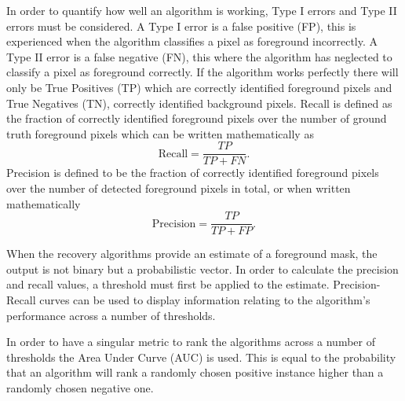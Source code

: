\documentclass[conference]{IEEEtran}
\begin{document}
In order to quantify how well an algorithm is working, Type I errors and Type II errors must be considered. A Type I error is a false positive (FP), this is experienced when the algorithm classifies a pixel as foreground incorrectly. A Type II error is a false negative (FN), this where the algorithm has neglected to classify a pixel as foreground correctly. If the algorithm works perfectly there will only be True Positives (TP) which are correctly identified foreground pixels and True Negatives (TN), correctly identified background pixels.
Recall is defined as the fraction of correctly identified foreground pixels over the number of ground truth foreground pixels which can be written mathematically as
\begin{equation}
  \label{eq:1}
\text{Recall} = \frac{TP}{TP + FN}. 
\end{equation}
Precision is defined to be the fraction of correctly identified foreground pixels over the number of detected foreground pixels in total, or when written mathematically
\begin{equation}
  \label{eq:2}
\text{Precision} = \frac{TP}{TP + FP}.
\end{equation} 

When the recovery algorithms provide an estimate of a foreground mask, the output is not binary but a probabilistic vector. In order to calculate the precision and recall values, a threshold must first be applied to the estimate. Precision-Recall curves can be used to display information relating to the algorithm's performance across a number of thresholds.

In order to have a singular metric to rank the algorithms across a number of thresholds the Area Under Curve (AUC) \cite{Hanley1983} is used. This is equal to the probability that an algorithm  will rank a randomly chosen positive instance higher than a randomly chosen negative one. 
\end{document}
